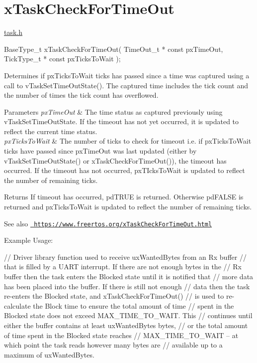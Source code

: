 \hypertarget{group__x_task_check_for_time_out}{}\section{x\+Task\+Check\+For\+Time\+Out}
\label{group__x_task_check_for_time_out}
\mbox{\hyperlink{task_8h_source}{task.\+h}} 
\begin{DoxyPre}BaseType\_t xTaskCheckForTimeOut( TimeOut\_t * const pxTimeOut, TickType\_t * const pxTicksToWait );\end{DoxyPre}


Determines if px\+Ticks\+To\+Wait ticks has passed since a time was captured using a call to v\+Task\+Set\+Time\+Out\+State(). The captured time includes the tick count and the number of times the tick count has overflowed.


\begin{DoxyParams}{Parameters}
{\em px\+Time\+Out} & The time status as captured previously using v\+Task\+Set\+Time\+Out\+State. If the timeout has not yet occurred, it is updated to reflect the current time status. \\
\hline
{\em px\+Ticks\+To\+Wait} & The number of ticks to check for timeout i.\+e. if px\+Ticks\+To\+Wait ticks have passed since px\+Time\+Out was last updated (either by v\+Task\+Set\+Time\+Out\+State() or x\+Task\+Check\+For\+Time\+Out()), the timeout has occurred. If the timeout has not occurred, px\+T\+Icks\+To\+Wait is updated to reflect the number of remaining ticks.\\
\hline
\end{DoxyParams}
\begin{DoxyReturn}{Returns}
If timeout has occurred, pd\+T\+R\+UE is returned. Otherwise pd\+F\+A\+L\+SE is returned and px\+Ticks\+To\+Wait is updated to reflect the number of remaining ticks.
\end{DoxyReturn}
\begin{DoxySeeAlso}{See also}
\href{https://www.freertos.org/xTaskCheckForTimeOut.html}{\texttt{ https\+://www.\+freertos.\+org/x\+Task\+Check\+For\+Time\+Out.\+html}}
\end{DoxySeeAlso}
Example Usage\+: 
\begin{DoxyPre}
   // Driver library function used to receive uxWantedBytes from an Rx buffer
   // that is filled by a UART interrupt. If there are not enough bytes in the
   // Rx buffer then the task enters the Blocked state until it is notified that
   // more data has been placed into the buffer. If there is still not enough
   // data then the task re-enters the Blocked state, and xTaskCheckForTimeOut()
   // is used to re-calculate the Block time to ensure the total amount of time
   // spent in the Blocked state does not exceed MAX\_TIME\_TO\_WAIT. This
   // continues until either the buffer contains at least uxWantedBytes bytes,
   // or the total amount of time spent in the Blocked state reaches
   // MAX\_TIME\_TO\_WAIT – at which point the task reads however many bytes are
   // available up to a maximum of uxWantedBytes.\end{DoxyPre}



